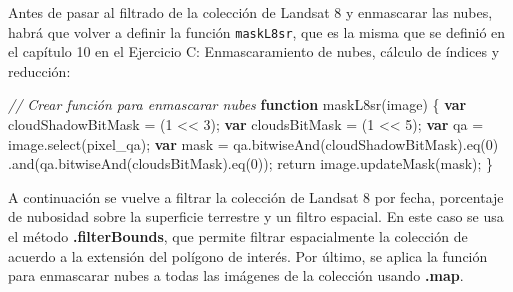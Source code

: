 \documentclass[
  12pt,
  letterpaper,
  twoside]{book}
\newenvironment{Shaded}{\begin{snugshade}}{\end{snugshade}}
\newcommand{\CommentTok}[1]{\textcolor[rgb]{0.24,0.58,0.00}{\textit{#1}}}
\newcommand{\ControlFlowTok}[1]{\textcolor[rgb]{0.00,0.00,0.00}{#1}}
\newcommand{\DecValTok}[1]{\textcolor[rgb]{0.28,0.53,0.93}{#1}}
\newcommand{\FunctionTok}[1]{\textcolor[rgb]{0.48,0.12,0.64}{#1}}
\newcommand{\KeywordTok}[1]{\textcolor[rgb]{0.00,0.00,0.00}{\textbf{#1}}}
\newcommand{\NormalTok}[1]{#1}
\newcommand{\OperatorTok}[1]{\textcolor[rgb]{0.00,0.00,0.00}{#1}}
\newcommand{\StringTok}[1]{\textcolor[rgb]{0.87,0.29,0.22}{#1}}
\newcommand\boldpurple[1]{\textcolor{darkpurple}{\textbf{#1}}}
\begin{document}
Antes de pasar al filtrado de la colección de Landsat 8 y enmascarar las nubes, habrá que volver a definir la función \texttt{maskL8sr}, que es la misma que se definió en el capítulo 10 en el Ejercicio C: Enmascaramiento de nubes, cálculo de índices y reducción:

\begin{Shaded}
\begin{Highlighting}[]
\CommentTok{// Crear función para enmascarar nubes}
\KeywordTok{function} \FunctionTok{maskL8sr}\NormalTok{(image) \{}
  \KeywordTok{var}\NormalTok{ cloudShadowBitMask }\OperatorTok{=}\NormalTok{ (}\DecValTok{1} \OperatorTok{\textless{}\textless{}} \DecValTok{3}\NormalTok{)}\OperatorTok{;}
  \KeywordTok{var}\NormalTok{ cloudsBitMask }\OperatorTok{=}\NormalTok{ (}\DecValTok{1} \OperatorTok{\textless{}\textless{}} \DecValTok{5}\NormalTok{)}\OperatorTok{;}
  \KeywordTok{var}\NormalTok{ qa }\OperatorTok{=}\NormalTok{ image}\OperatorTok{.}\FunctionTok{select}\NormalTok{(}\StringTok{\textquotesingle{}pixel\_qa\textquotesingle{}}\NormalTok{)}\OperatorTok{;}
  \KeywordTok{var}\NormalTok{ mask }\OperatorTok{=}\NormalTok{ qa}\OperatorTok{.}\FunctionTok{bitwiseAnd}\NormalTok{(cloudShadowBitMask)}\OperatorTok{.}\FunctionTok{eq}\NormalTok{(}\DecValTok{0}\NormalTok{)}
                 \OperatorTok{.}\FunctionTok{and}\NormalTok{(qa}\OperatorTok{.}\FunctionTok{bitwiseAnd}\NormalTok{(cloudsBitMask)}\OperatorTok{.}\FunctionTok{eq}\NormalTok{(}\DecValTok{0}\NormalTok{))}\OperatorTok{;}
  \ControlFlowTok{return}\NormalTok{ image}\OperatorTok{.}\FunctionTok{updateMask}\NormalTok{(mask)}\OperatorTok{;}
\NormalTok{\}}
\end{Highlighting}
\end{Shaded}

A continuación se vuelve a filtrar la colección de Landsat 8 por fecha, porcentaje de nubosidad sobre la superficie terrestre y un filtro espacial. En este caso se usa el método \boldpurple{.filterBounds}, que permite filtrar espacialmente la colección de acuerdo a la extensión del polígono de interés. Por último, se aplica la función para enmascarar nubes a todas las imágenes de la colección usando \boldpurple{.map}.
\end{document}
